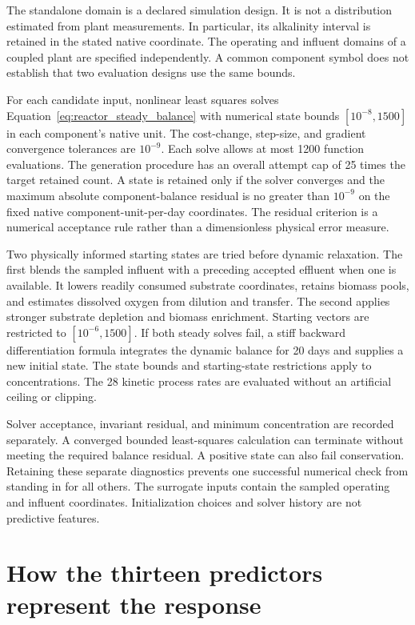 The standalone domain is a declared simulation design. It is not a distribution estimated from plant measurements. In particular, its alkalinity interval is retained in the stated native coordinate. The operating and influent domains of a coupled plant are specified independently. A common component symbol does not establish that two evaluation designs use the same bounds.

For each candidate input, nonlinear least squares solves Equation~\eqref{eq:reactor_steady_balance} with numerical state bounds $[10^{-8},1500]$ in each component's native unit. The cost-change, step-size, and gradient convergence tolerances are $10^{-9}$. Each solve allows at most 1200 function evaluations. The generation procedure has an overall attempt cap of 25 times the target retained count. A state is retained only if the solver converges and the maximum absolute component-balance residual is no greater than $10^{-9}$ on the fixed native component-unit-per-day coordinates. The residual criterion is a numerical acceptance rule rather than a dimensionless physical error measure.

Two physically informed starting states are tried before dynamic relaxation. The first blends the sampled influent with a preceding accepted effluent when one is available. It lowers readily consumed substrate coordinates, retains biomass pools, and estimates dissolved oxygen from dilution and transfer. The second applies stronger substrate depletion and biomass enrichment. Starting vectors are restricted to $[10^{-6},1500]$. If both steady solves fail, a stiff backward differentiation formula integrates the dynamic balance for 20 days and supplies a new initial state. The state bounds and starting-state restrictions apply to concentrations. The 28 kinetic process rates are evaluated without an artificial ceiling or clipping.

Solver acceptance, invariant residual, and minimum concentration are recorded separately. A converged bounded least-squares calculation can terminate without meeting the required balance residual. A positive state can also fail conservation. Retaining these separate diagnostics prevents one successful numerical check from standing in for all others. The surrogate inputs contain the sampled operating and influent coordinates. Initialization choices and solver history are not predictive features.

\section{How the thirteen predictors represent the response}

